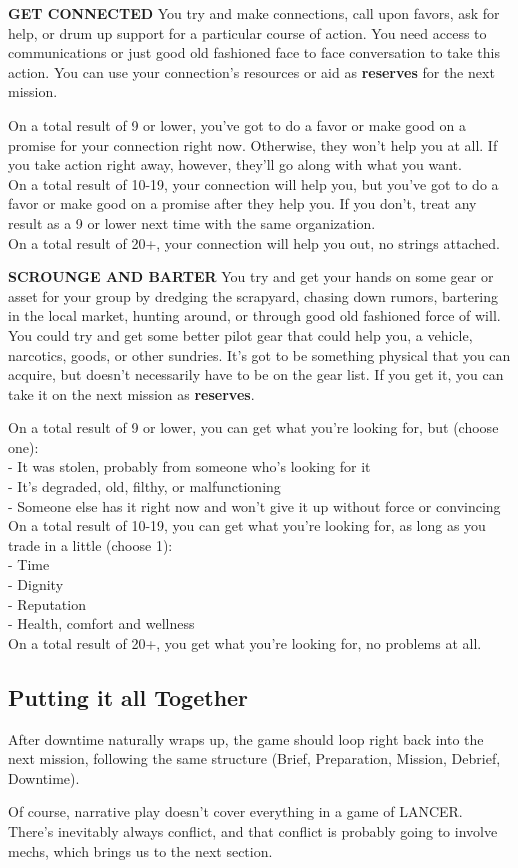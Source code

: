 \textbf{GET CONNECTED}
You try and make connections, call upon favors, ask for help, or drum up support for a particular
course of action. You need access to communications or just good old fashioned face to face
conversation to take this action. You can use your connection’s resources or aid as \textbf{reserves} for
the next mission.

On a total result of 9 or lower, you’ve got to do a favor or make good on a promise for your connection right now. Otherwise, they won’t help you at all. If you take action right away, however, they’ll go along with what you want.\\
On a total result of 10-19, your connection will help you, but you’ve got to do a favor or make good on a promise after they help you. If you don’t, treat any result as a 9 or lower next time with the same organization.\\
On a total result of 20+, your connection will help you out, no strings attached.

\textbf{SCROUNGE AND BARTER}
You try and get your hands on some gear or asset for your group by dredging the scrapyard, chasing down rumors, bartering in the local market, hunting around, or through good old fashioned force of will. You could try and get some better pilot gear that could help you, a vehicle, narcotics, goods, or other sundries. It’s got to be something physical that you can acquire, but doesn’t necessarily have to be on the gear list. If you get it, you can take it on the next mission as \textbf{reserves}.

On a total result of 9 or lower, you can get what you’re looking for, but (choose one):\\
-    It was stolen, probably from someone who’s looking for it\\
-    It’s degraded, old, filthy, or malfunctioning\\
-    Someone else has it right now and won’t give it up without force or convincing\\
On a total result of 10-19, you can get what you’re looking for, as long as you trade in a little (choose 1):\\
-    Time\\
-    Dignity\\
-    Reputation\\
-   Health, comfort and wellness\\
On a total result of 20+, you get what you’re looking for, no problems at all.

\subsection{Putting it all Together}

After downtime naturally wraps up, the game should loop right back into the next mission, following the same structure (Brief, Preparation, Mission, Debrief, Downtime).

Of course, narrative play doesn’t cover everything in a game of LANCER. There’s inevitably always conflict, and that conflict is probably going to involve mechs, which brings us to the next section.
